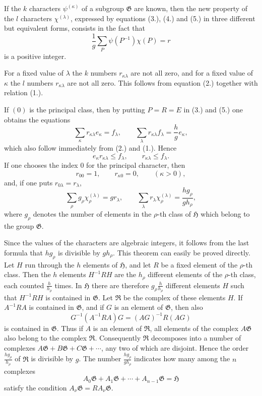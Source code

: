 \documentclass[11pt]{article}
\newcommand{\Hgr}{\mathfrak{H}}
\newcommand{\Ggr}{\mathfrak{G}}
\begin{document}
If the $k$ characters $\psi^{(\kappa)}$ of a subgroup $\Ggr$ are known, then the new property of the $l$ characters $\chi^{(\lambda)}$, expressed by equations (3.), (4.) and (5.) in three different but equivalent forms, consists in the fact that
\[
\tag{4a.}
  \frac{1}{g}\sum_P \psi(P^{-1})\chi(P)=r
\]
is a positive integer.

For a fixed value of $\lambda$ the $k$ numbers $r_{\kappa\lambda}$ are not all zero, and for a fixed value of $\kappa$ the $l$ numbers $r_{\kappa\lambda}$ are not all zero. This follows from equation (2.) together with relation (1.).

If $(0)$ is the principal class, then by putting $P=R=E$ in (3.) and (5.) one obtains the equations
\[
\tag{6.}
  \sum_\kappa r_{\kappa\lambda}e_\kappa=f_\lambda,
  \qquad
  \sum_\lambda r_{\kappa\lambda}f_\lambda=\frac{h}{g}e_\kappa,
\]
which also follow immediately from (2.) and (1.). Hence
\[
\tag{7.}
  e_\kappa r_{\kappa\lambda}\le f_\lambda,
  \qquad
  r_{\kappa\lambda}\le f_\lambda.
\]
If one chooses the index $0$ for the principal character, then
\[
\tag{8.}
  r_{00}=1,\qquad r_{\kappa 0}=0,\qquad(\kappa>0),
\]
and, if one puts $r_{0\lambda}=r_\lambda$,
\[
\tag{9.}
  \sum_\rho g_\rho\chi_\rho^{(\lambda)}=g r_\lambda,
  \qquad
  \sum_\lambda r_\lambda\chi_\rho^{(\lambda)}
  =
  \frac{h g_\rho}{g h_\rho},
\]
where $g_\rho$ denotes the number of elements in the $\rho$-th class of $\Hgr$ which belong to the group $\Ggr$.

Since the values of the characters are algebraic integers, it follows from the last formula that $h g_\rho$ is divisible by $g h_\rho$. This theorem can easily be proved directly. Let $H$ run through the $h$ elements of $\Hgr$, and let $R$ be a fixed element of the $\rho$-th class. Then the $h$ elements $H^{-1}RH$ are the $h_\rho$ different elements of the $\rho$-th class, each counted $\frac{h}{h_\rho}$ times. In $\Hgr$ there are therefore $g_\rho\frac{h}{h_\rho}$ different elements $H$ such that $H^{-1}RH$ is contained in $\Ggr$. Let $\mathfrak R$ be the complex of these elements $H$. If $A^{-1}RA$ is contained in $\Ggr$, and if $G$ is an element of $\Ggr$, then also
\[
  G^{-1}(A^{-1}RA)G=(AG)^{-1}R(AG)
\]
is contained in $\Ggr$. Thus if $A$ is an element of $\mathfrak R$, all elements of the complex $A\Ggr$ also belong to the complex $\mathfrak R$. Consequently $\mathfrak R$ decomposes into a number of complexes $A\Ggr+B\Ggr+C\Ggr+\cdots$, any two of which are disjoint. Hence the order $\frac{h g_\rho}{h_\rho}$ of $\mathfrak R$ is divisible by $g$. The number $\frac{h g_\rho}{g h_\rho}$ indicates how many among the $n$ complexes
\[
\tag{10.}
  A_0\Ggr+A_1\Ggr+\cdots+A_{n-1}\Ggr=\Hgr
\]
satisfy the condition $A_\nu\Ggr=R A_\nu\Ggr$.
\end{document}
